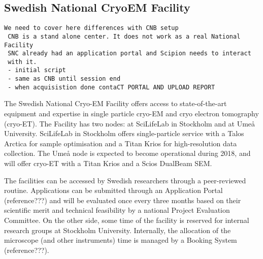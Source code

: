 
\subsection{Swedish National CryoEM Facility}

\begin{verbatim}
We need to cover here differences with CNB setup
 CNB is a stand alone center. It does not work as a real National Facility
 SNC already had an application portal and Scipion needs to interact
 with it. 
 - initial script
 - same as CNB until session end
 - when acquisistion done contaCT PORTAL AND UPLOAD REPORT
\end{verbatim}

The Swedish National Cryo-EM Facility offers access to state-of-the-art equipment and expertise 
in single particle cryo-EM and cryo electron tomography (cryo-ET). The Facility has two nodes: at SciLifeLab 
in Stockholm and at Umeå University. SciLifeLab in Stockholm offers single-particle service with a 
Talos Arctica for sample optimisation and a Titan Krios for high-resolution data collection. 
The Umeå node is expected to become operational during 2018, and will offer cryo-ET with a 
Titan Krios and a Scios DualBeam SEM.

The facilities can be accessed by Swedish researchers through a peer-reviewed routine. Applications can be 
submitted through an Application Portal (reference???) and will be evaluated once every three months based on their 
scientific merit and technical feasibility by a national Project Evaluation Committee. On the other side, 
some time of the facility is reserved for internal research groups at Stockholm University. Internally, the allocation
of the microscope (and other instruments) time is managed by a Booking System (reference???). 


